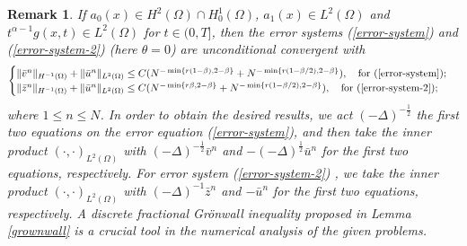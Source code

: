 \documentclass[11pt]{article}
\newtheorem{remark}{Remark}[section]
\numberwithin{equation}{section}
\begin{document}
\begin{remark} If $a_0(x)\in H^2(\Omega)\cap H_0^1(\Omega)$, $a_1(x)\in L^2(\Omega)$ and $t^{\alpha-1}g(x,t)\in L^2(\Omega)$ for $t\in(0,T]$, then the error systems (\ref{error-system}) and (\ref{error-system-2}) (here $\theta=0$) are unconditional convergent with 
\[  \begin{cases} 
 \|\bar v^n\|_{H^{-1}(\Omega)}+\| \bar u^n\|_{L^2(\Omega)} \le C(N^{-\min\{r(1-\beta),2-\beta\}}+N^{-\min\{r(1-\beta/2),2-\beta\}}), \quad \text{for (\ref{error-system})};\\  
 \|\bar z^n\|_{H^{-1}(\Omega)}+\| \bar u^n\|_{L^2(\Omega)} \le C(N^{-\min\{r\beta,2-\beta\}}+N^{-\min\{r(1-\beta/2),2-\beta\}}),\quad \text{for (\ref{error-system-2})};  
 \end{cases} \] 
 where $1 \leq n \leq N$.
 In order to obtain the desired results, we act $(-\Delta)^{-\frac12}$ the first two equations on the error equation (\ref{error-system}), and then take the inner product $(\cdot,\cdot)_{L^2(\Omega)}$ with $(-\Delta)^{-\frac12}\bar v^n$ and $-(-\Delta)^{\frac12} \bar u^n$ for the first two equations, respectively. For error system (\ref{error-system-2}) , we take the inner product $(\cdot,\cdot)_{L^2(\Omega)}$ with $(-\Delta)^{-1}\bar z^n$ and $-\bar u^n$ for the first two equations, respectively.
A discrete fractional Gr\"{o}nwall inequality proposed in Lemma \ref{grownwall} is a crucial tool
in the numerical analysis of the given problems.   
\end{remark}
\end{document}
